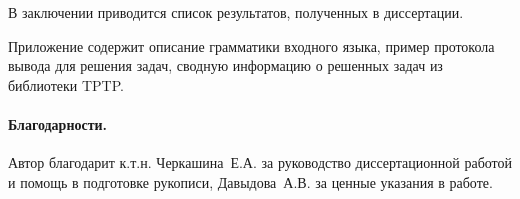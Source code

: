 В заключении приводится список результатов, полученных в диссертации. %

Приложение содержит описание грамматики входного языка, пример протокола вывода для решения задач, сводную информацию о решенных задач из библиотеки TPTP.

\paragraph{Благодарности.} Автор благодарит к.т.н. Черкашина~Е.А. за руководство диссертационной работой и помощь в подготовке рукописи, Давыдова~А.В. за ценные указания в работе.


